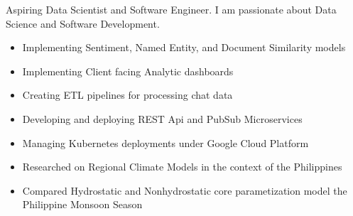 \documentclass[10pt,a4paper]{altacv}
\begin{document}



Aspiring Data Scientist and Software Engineer. I am passionate about Data Science and Software Development.


\begin{itemize}
\item Implementing Sentiment, Named Entity, and Document Similarity models
\item Implementing Client facing Analytic dashboards
\item Creating ETL pipelines for processing chat data
\item Developing and deploying REST Api and PubSub Microservices
\item Managing Kubernetes deployments under Google Cloud Platform
\end{itemize}

\divider

\begin{itemize}
\item Researched on Regional Climate Models in the context of the Philippines
\item Compared  Hydrostatic and Nonhydrostatic core parametization model the Philippine Monsoon Season
\end{itemize}
\end{document}
